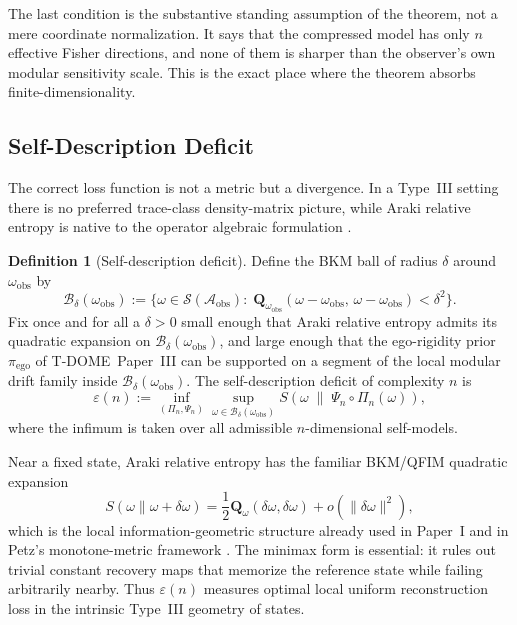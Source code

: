 \documentclass[12pt]{article}
\theoremstyle{definition}
\newtheorem{definition}[theorem]{Definition}
\theoremstyle{remark}
\begin{document}
The last condition is the substantive standing assumption of the
theorem, not a mere coordinate normalization. It says that the
compressed model has only \(n\) effective Fisher directions, and none of
them is sharper than the observer's own modular sensitivity scale. This
is the exact place where the theorem absorbs finite-dimensionality.

\subsection{Self-Description Deficit}\label{subsec:2.3}

The correct loss function is not a metric but a divergence. In a
Type~III setting there is no preferred trace-class density-matrix
picture, while Araki relative entropy is native to the operator
algebraic formulation \cite{Araki1976}.

\begin{definition}[Self-description deficit]\label{def:2.3}
Define the BKM ball of radius \(\delta\) around
\(\omega_{\mathrm{obs}}\) by
\[
\mathcal{B}_\delta(\omega_{\mathrm{obs}})
:=
\bigl\{
\omega\in\mathcal{S}(\mathcal{A}_{\mathrm{obs}})
:\;
\mathbf{Q}_{\omega_{\mathrm{obs}}}(\omega-\omega_{\mathrm{obs}},\,
\omega-\omega_{\mathrm{obs}})
<\delta^2
\bigr\}.
\]
Fix once and for all a \(\delta>0\) small enough that Araki relative
entropy admits its quadratic expansion on
\(\mathcal{B}_\delta(\omega_{\mathrm{obs}})\), and large enough that
the ego-rigidity prior \(\pi_{\mathrm{ego}}\) of
T-DOME~Paper~III\cite{TDOMEIII} can be supported on a segment of the
local modular drift family inside
\(\mathcal{B}_\delta(\omega_{\mathrm{obs}})\). The self-description
deficit of complexity \(n\) is
\[
\varepsilon(n)
:=
\inf_{(\Pi_n,\Psi_n)}
\sup_{\omega\in \mathcal{B}_\delta(\omega_{\mathrm{obs}})}
S\!\left(
\omega
\;\middle\|\;
\Psi_n\circ\Pi_n(\omega)
\right),
\]
where the infimum is taken over all admissible \(n\)-dimensional
self-models.
\end{definition}

Near a fixed state, Araki relative entropy has the familiar BKM/QFIM
quadratic expansion
\[
S(\omega\|\omega+\delta\omega)
=
\frac{1}{2}\mathbf{Q}_\omega(\delta\omega,\delta\omega)
+o(\|\delta\omega\|^2),
\]
which is the local information-geometric structure already used in
Paper~I\cite{PaperI} and in Petz's monotone-metric framework
\cite{Petz1996}. The minimax form is essential: it rules out trivial
constant recovery maps that memorize the reference state while failing
arbitrarily nearby. Thus \(\varepsilon(n)\) measures optimal local
uniform reconstruction loss in the intrinsic Type~III geometry of
states.
\end{document}
